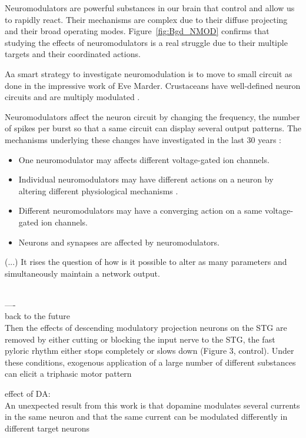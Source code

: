 \begin{pinkshaded}
Neuromodulators are powerful substances in our brain that control and allow us to rapidly react. Their mechanisms are complex due to their diffuse projecting and their broad operating modes. Figure~\ref{fig:Bgd_NMOD} confirms that studying the effects of neuromodulators is a real struggle due to their multiple targets and their coordinated actions. 

Aa smart strategy to investigate neuromodulation is to move to small circuit as done in the impressive work of Eve Marder. Crustaceans have well-defined neuron circuits and are multiply modulated \citep{marder_understanding_2007}.

Neuromodulators affect the neuron circuit by changing the frequency, the number of spikes per burst so that a same circuit can display several output patterns. The mechanisms underlying these changes have investigated in the last 30 years \citep{nadim_neuromodulation_2014, marder_understanding_2007}: 
\begin{itemize}
    \item One neuromodulator may affects different voltage-gated ion channels.
    \item Individual neuromodulators may have different actions on a neuron by altering different physiological mechanisms .
    \item Different neuromodulators may have a converging action on a same voltage-gated ion channels.
    \item Neurons and synapses are affected by neuromodulators. 
\end{itemize}

(...) It rises the question of how is it possible to alter as many parameters and simultaneously maintain a network output. 

~\\
----\\
back to the future\\

Then the effects of descending modulatory projection neurons on the STG are removed by either cutting or blocking the input nerve to the STG, the fast pyloric rhythm either stops completely or slows down (Figure 3, control). Under these conditions, exogenous application of a large number of different substances can elicit a triphasic motor pattern


effect of DA: \\
An unexpected result from this work is that dopamine modulates several currents in the same neuron and that the same current can be modulated differently in different target neurons



\end{pinkshaded}
